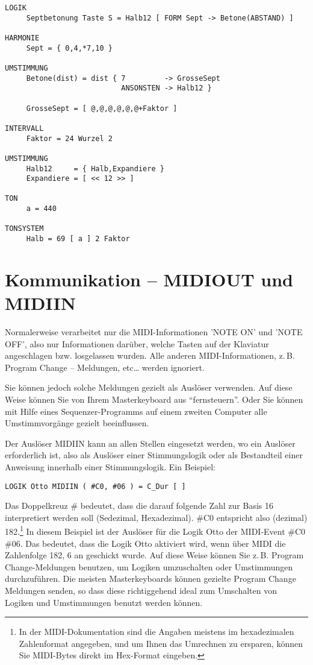 \label{AUSWAHL}
\begin{verbatim}
LOGIK
     Septbetonung Taste S = Halb12 [ FORM Sept -> Betone(ABSTAND) ]

HARMONIE
     Sept = { 0,4,*7,10 }

UMSTIMMUNG
     Betone(dist) = dist { 7         -> GrosseSept
                           ANSONSTEN -> Halb12 }

     GrosseSept = [ @,@,@,@,@,@+Faktor ]

INTERVALL
     Faktor = 24 Wurzel 2

UMSTIMMUNG
     Halb12     = { Halb,Expandiere }
     Expandiere = [ << 12 >> ]

TON
     a = 440

TONSYSTEM
     Halb = 69 [ a ] 2 Faktor
\end{verbatim}



\section{Kommunikation -- MIDIOUT und MIDIIN}\label{sec:komm-midi-und}
\label{STATUSBYTE}
Normalerweise verarbeitet \mutabor{} nur die MIDI-Informationen 'NOTE ON' 
und 'NOTE OFF', also nur Informationen darüber, welche Tasten auf der 
Klaviatur angeschlagen bzw. losgelassen wurden. Alle anderen 
MIDI-Informationen, z.\,B. Program Change -- Meldungen, etc\dots{} werden 
ignoriert.

Sie können jedoch solche Meldungen gezielt als Auslöser verwenden. 
Auf diese Weise können Sie \mutabor{} von Ihrem Masterkeyboard aus 
"`fernsteuern"'. Oder Sie können mit Hilfe eines Sequenzer-Programms auf einem 
zweiten Computer alle Umstimmvorgänge gezielt beeinflussen.

Der Auslöser MIDIIN kann an allen Stellen eingesetzt werden, 
wo ein Auslöser erforderlich ist, also als Auslöser einer 
Stimmungslogik oder als Bestandteil einer Anweisung innerhalb einer 
Stimmungslogik. Ein Beispiel:
\begin{verbatim}
LOGIK Otto MIDIIN ( #C0, #06 ) = C_Dur [ ]
\end{verbatim}
Das Doppelkreuz \# bedeutet, dass die darauf folgende Zahl zur Basis 16
interpretiert werden soll (Sedezimal, Hexadezimal). \#C0 entspricht
also (dezimal) 182.\footnote{In der MIDI-Dokumentation sind die
  Angaben meistens im hexadezimalen Zahlenformat angegeben, und um
  Ihnen das Umrechnen zu ersparen, können Sie MIDI-Bytes direkt im
  Hex-Format eingeben.} In diesem Beispiel ist der Auslöser für die
Logik Otto  der MIDI-Event \#C0 \#06. Das bedeutet,
dass die Logik Otto aktiviert wird, wenn über MIDI die Zahlenfolge 182,
6 an \mutabor{} geschickt wurde. Auf diese Weise können Sie z.\,B. Program
Change-Meldungen benutzen, um Logiken umzuschalten oder Umstimmungen
durchzuführen. Die meisten Masterkeyboards können gezielte Program
Change Meldungen senden, so dass diese richtiggehend ideal zum
Umschalten von Logiken und Umstimmungen benutzt werden können.

